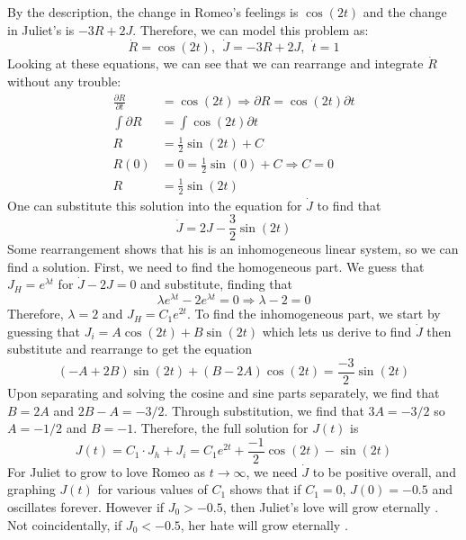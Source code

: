 \documentclass{article}
\begin{document}
\hangindent=20pt
\vspace{20pt}
\newline By the description, the change in Romeo's feelings is $\cos{(2t)}$ and the change in Juliet's is $-3R + 2J$.  Therefore, we can model this problem as:
\[
\dot{R} = \cos{(2t)}, \:\: \dot{J} = -3R + 2J, \:\: \dot{t} = 1
\]
Looking at these equations, we can see that we can rearrange and integrate $\dot{R}$ without any trouble:
\begin{align*}
    \frac{\partial R}{\partial t} &= \cos{(2t)} \Rightarrow \partial{R} = \cos{(2t)} \partial{t} \\
    \int \partial{R} &= \int \cos{(2t)} \partial{t} \\
    R &= \frac{1}{2}\sin{(2t)} + C \\
    R(0) &= 0 = \frac{1}{2}\sin{(0)} + C \Rightarrow C = 0 \\
    R &= \frac{1}{2}\sin{(2t)}
\end{align*}
One can substitute this solution into the equation for $\dot{J}$ to find that
\[
\dot{J} = 2J - \frac{3}{2}\sin{(2t)}
\]
Some rearrangement shows that his is an inhomogeneous linear system, so we can find a solution.  First, we need to find the homogeneous part.  We guess that $J_H = e^{\lambda t}$ for $\dot{J} - 2J = 0$ and substitute, finding that
\[
\lambda e^{\lambda t} - 2 e^{\lambda t} = 0 \Rightarrow \lambda - 2 = 0
\]
Therefore, $\lambda = 2$ and $J_H = C_1 e^{2t}$.  To find the inhomogeneous part, we start by guessing that $J_i = A \cos{(2t)} + B \sin{(2t)}$ which lets us derive to find $\dot{J}$ then substitute and rearrange to get the equation
\[
(-A + 2B) \sin{(2t)} + (B - 2A)\cos{(2t)} = \frac{-3}{2}\sin{(2t)}
\]
Upon separating and solving the cosine and sine parts separately, we find that $B = 2A$ and $2B - A = -3/2$.  Through substitution, we find that $3A = -3/2$ so $A = -1/2$ and $B = -1$.  Therefore, the full solution for $J(t)$ is
\[
J(t) = C_1 \cdot J_h + J_i = C_1 e^{2t} + \frac{-1}{2}\cos{(2t)} - \sin{(2t)}
\]
\newline For Juliet to grow to love Romeo as $t \to \infty$, we need $\dot{J}$ to be positive overall, and graphing $J(t)$ for various values of $C_1$ shows that if $C_1 = 0$, $J(0) = -0.5$ and oscillates forever.  However if $J_0 > -0.5$, then Juliet's love will grow eternally \Smiley.  Not coincidentally, if $J_0 < -0.5$, her hate will grow eternally \Frowny.
\end{document}
